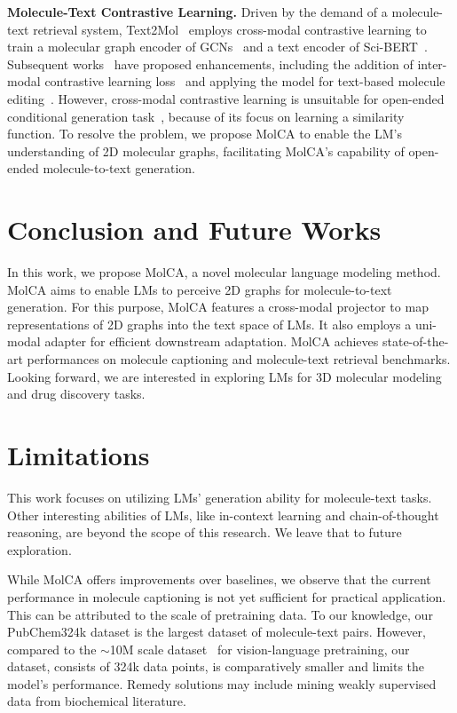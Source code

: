 \documentclass[11pt]{article}
\begin{document}
\textbf{Molecule-Text Contrastive Learning.} Driven by the demand of a molecule-text retrieval system, Text2Mol~\citep{Text2Mol} employs cross-modal contrastive learning to train a molecular graph encoder of GCNs~\cite{GCN} and a text encoder of Sci-BERT~\cite{SciBERT}. Subsequent works~\cite{MoMu, MoleculeSTM, CLAMP} have proposed enhancements, including the addition of inter-modal contrastive learning loss~\citep{MoMu} and applying the model for text-based molecule editing~\citep{MoleculeSTM}. However, cross-modal contrastive learning is unsuitable for open-ended conditional generation task~\cite{Flamingo}, because of its focus on learning a similarity function. 
To resolve the problem, we propose MolCA to enable the LM's understanding of 2D molecular graphs, facilitating MolCA's capability of open-ended molecule-to-text generation.




%
 \vspace{-3mm}
\section{Conclusion and Future Works}

\vspace{-3mm}
In this work, we propose MolCA, a novel molecular language modeling method. MolCA aims to enable LMs to perceive 2D graphs for molecule-to-text generation. For this purpose, MolCA features a cross-modal projector to map representations of 2D graphs into the text space of LMs. It also employs a uni-modal adapter for efficient downstream adaptation. MolCA achieves state-of-the-art performances on molecule captioning and molecule-text retrieval benchmarks. Looking forward, we are interested in exploring LMs for 3D molecular modeling and drug discovery tasks.



\section*{Limitations}
This work focuses on utilizing LMs' generation ability for molecule-text tasks. Other interesting abilities of LMs, like in-context learning and chain-of-thought reasoning, are beyond the scope of this research. We leave that to future exploration. 

While MolCA offers improvements over baselines, we observe that the current performance in molecule captioning is not yet sufficient for practical application. This can be attributed to the scale of pretraining data. To our knowledge, our PubChem324k dataset is the largest dataset of molecule-text pairs. However, compared to the $\sim$10M scale dataset~\citep{CC12M} for vision-language pretraining, our dataset, consists of 324k data points, is comparatively smaller and limits the model's performance. Remedy solutions may include mining weakly supervised data from biochemical literature.
\end{document}

